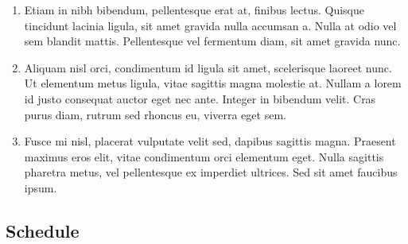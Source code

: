 \begin{enumerate}
	\item Etiam in nibh bibendum, pellentesque erat at, finibus lectus. Quisque tincidunt lacinia ligula, sit amet gravida nulla accumsan a. Nulla at odio vel sem blandit mattis. Pellentesque vel fermentum diam, sit amet gravida nunc. 
	\item Aliquam nisl orci, condimentum id ligula sit amet, scelerisque laoreet nunc. Ut elementum metus ligula, vitae sagittis magna molestie at. Nullam a lorem id justo consequat auctor eget nec ante. Integer in bibendum velit. Cras purus diam, rutrum sed rhoncus eu, viverra eget sem. 
	\item Fusce mi nisl, placerat vulputate velit sed, dapibus sagittis magna. Praesent maximus eros elit, vitae condimentum orci elementum eget. Nulla sagittis pharetra metus, vel pellentesque ex imperdiet ultrices. Sed sit amet faucibus ipsum.
\end{enumerate}

\subsection{Schedule}


